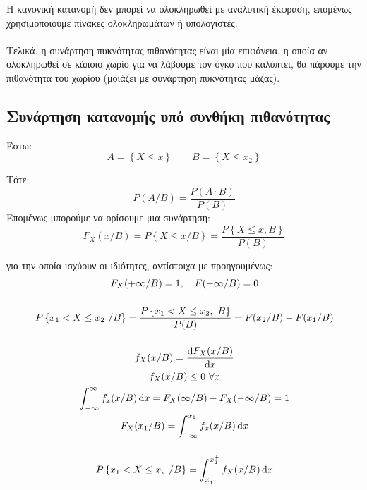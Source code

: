\documentclass[11pt,a4paper,notitlepage,fleqn,final]{article}
\begin{document}
	
	Η κανονική κατανομή δεν μπορεί να ολοκληρωθεί με αναλυτική έκφραση,
	επομένως χρησιμοποιούμε πίνακες ολοκληρωμάτων ή υπολογιστές.
	
	\paragraph{}
	Τελικά, η συνάρτηση πυκνότητας πιθανότητας είναι μία επιφάνεια,
	η οποία αν ολοκληρωθεί σε κάποιο χωρίο για να λάβουμε τον όγκο που
	καλύπτει, θα πάρουμε την πιθανότητα του χωρίου (μοιάζει με συνάρτηση
	πυκνότητας μάζας).
	
	\subsection{Συνάρτηση κατανομής υπό συνθήκη πιθανότητας}
	Έστω:
	\[
	A = \left\lbrace X \leq x \right\rbrace
	\qquad
	B = \left\lbrace X \leq x_2 \right\rbrace
	\]
	
	Τότε:
	\[
	P(A/B) = \frac{P(A\cdot B)}{P(B)}
	\]
	Επομένως μπορούμε να ορίσουμε μια συνάρτηση:
	\[
	\boxed{
		F_X(x/B) = P\left\lbrace X\leq x/B \right\rbrace
		= \frac{P\left\lbrace X\leq x, B \right\rbrace}{P(B)}
		}
	\]
	
	για την οποία ισχύουν οι ιδιότητες, αντίστοιχα με προηγουμένως:
	\begin{gather*}
		F_X(+\infty/B) = 1, \quad F(-\infty/B) = 0 \\[3ex]
		P\left\lbrace x_1<X\leq x_2\ /B \right\rbrace
		=\frac{P\left\lbrace x_1 < X\leq x_2,\ B \right\rbrace}{P(B)}
		=F(x_2/B) - F(x_1/B)
		\\[3ex]
		f_X(x/B) = \frac{\mathop{}\!\mathrm{d} F_X(x/B)}{\mathop{}\!\mathrm{d} x} \\
		f_X(x/B) \leq 0 \ \forall x \\
		\int_{-\infty}^{\infty} f_x(x/B) \mathop{}\!\mathrm{d} x = F_X(\infty/B)
		- F_X(-\infty/B) = 1 \\
		F_X(x_1/B) = \int_{-\infty}^{x_1} f_x(x/B)\mathop{}\!\mathrm{d} x
		\\[3ex]
		P \left\lbrace x_1<X\leq x_2\ /B \right\rbrace
	    = \int_{x_1^+}^{x_2^+} f_X(x/B)\mathop{}\!\mathrm{d} x
	\end{gather*}
	
\end{document}
